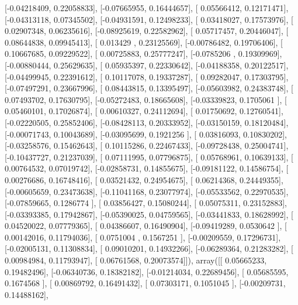 \documentclass{article}
\begin{document}
       [-0.04218409,  0.22058833],
       [-0.07665955,  0.16444657],
       [ 0.05566412,  0.12171471],
       [-0.04313118,  0.07345502],
       [-0.04931591,  0.12498233],
       [ 0.03418027,  0.17573976],
       [ 0.02907348,  0.06235616],
       [-0.08925619,  0.22582962],
       [ 0.05717457,  0.20446047],
       [ 0.08644838,  0.09945413],
       [ 0.013429  ,  0.23125569],
       [-0.00786482,  0.19706406],
       [ 0.10667685,  0.09229522],
       [ 0.00725883,  0.25777247],
       [-0.0785206 ,  0.19309969],
       [-0.00880444,  0.25629635],
       [ 0.05935397,  0.22330642],
       [-0.04188358,  0.20122517],
       [-0.04499945,  0.22391612],
       [ 0.10117078,  0.19337287],
       [ 0.09282047,  0.17303795],
       [-0.07497291,  0.23667996],
       [ 0.08443815,  0.13395497],
       [-0.05603982,  0.24383748],
       [ 0.07493702,  0.17630795],
       [-0.05272483,  0.18665608],
       [-0.03339823,  0.1705061 ],
       [ 0.05460101,  0.17026874],
       [ 0.00610327,  0.24112694],
       [ 0.01750692,  0.12760541],
       [-0.02220505,  0.25852406],
       [-0.08428113,  0.20333952],
       [-0.03150159,  0.18120484],
       [-0.00071743,  0.10043689],
       [-0.03095699,  0.1921256 ],
       [ 0.03816093,  0.10830202],
       [-0.03258576,  0.15462643],
       [ 0.10115286,  0.22467433],
       [-0.09728438,  0.25004741],
       [-0.10437727,  0.21237039],
       [ 0.07111995,  0.07796875],
       [ 0.05768961,  0.10639133],
       [ 0.00764532,  0.07019742],
       [-0.02858731,  0.14855675],
       [-0.09181122,  0.14586754],
       [ 0.00276686,  0.16748416],
       [ 0.03521432,  0.24954675],
       [ 0.06214368,  0.24449355],
       [-0.00605659,  0.23473638],
       [-0.11041168,  0.23077974],
       [-0.05533562,  0.22970535],
       [-0.07859665,  0.1286774 ],
       [ 0.03856427,  0.15080244],
       [ 0.05075311,  0.23152883],
       [-0.03393385,  0.17942867],
       [-0.05390025,  0.04759565],
       [-0.03441833,  0.18628992],
       [ 0.04520022,  0.07779365],
       [ 0.04386607,  0.16490904],
       [-0.09419289,  0.0530642 ],
       [ 0.00142016,  0.11794036],
       [ 0.0751004 ,  0.1567251 ],
       [-0.00209559,  0.17296731],
       [-0.02005131,  0.11308834],
       [ 0.09010201,  0.14932266],
       [-0.06289364,  0.21283282],
       [ 0.00984984,  0.11793947],
       [ 0.06761568,  0.20073574]]), array([[ 0.05665233,  0.19482496],
       [-0.06340736,  0.18382182],
       [-0.01214034,  0.22689456],
       [ 0.05685595,  0.1674568 ],
       [ 0.00869792,  0.16491432],
       [ 0.07303171,  0.1051045 ],
       [-0.00209731,  0.14488162],
\end{document}
